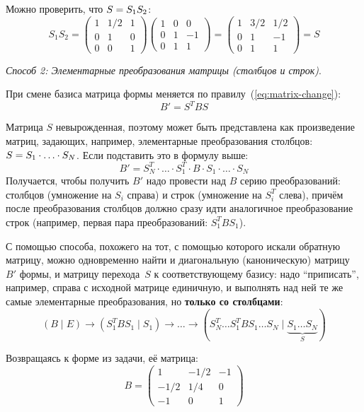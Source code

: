 \documentclass[a4paper,12pt]{article}
\begin{document}
\begin{solution}
    Можно проверить, что $S \hm= S_1 S_2$:
    \[
      S_1 S_2 = \begin{pmatrix}
        1 & 1/2 & 1\\
        0 & 1 & 0\\
        0 & 0 & 1
      \end{pmatrix} \begin{pmatrix}
        1 & 0 & 0\\
        0 & 1 & -1\\
        0 & 1 & 1
      \end{pmatrix} = \begin{pmatrix}
        1 & 3/2 & 1/2\\
        0 & 1 & -1\\
        0 & 1 & 1
      \end{pmatrix} = S
    \]
    
    \bigskip
    
    \emph{Способ 2: Элементарные преобразования матрицы (столбцов и строк)}.
    
    При смене базиса матрица формы меняется по правилу~(\ref{eq:matrix-change}):
    \[
      B' = S^T B S
    \]
    
    Матрица $S$ невырожденная, поэтому может быть представлена как произведение матриц, задающих, например, элементарные преобразования столбцов: $S \hm= S_1 \hm\cdot \ldots \hm\cdot S_N$.
    Если подставить это в формулу выше:
    \[
      B' = S_N^T \cdot \ldots \cdot S_1^T \cdot B \cdot S_1 \cdot \ldots \cdot S_N
    \]
    Получается, чтобы получить $B'$ надо провести над $B$ серию преобразований: столбцов (умножение на $S_i$ справа) и строк (умножение на $S_i^T$ слева), причём после преобразования столбцов должно сразу идти аналогичное преобразование строк (например, первая пара преобразований: $S_1^T B S_1$).
    
    С помощью способа, похожего на тот, с помощью которого искали обратную матрицу, можно одновременно найти и диагональную (каноническую) матрицу~$B'$ формы, и матрицу перехода~$S$ к соответствующему базису: надо ``приписать'', например, справа с исходной матрице единичную, и выполнять над ней те же самые элементарные преобразования, но \textbf{только со столбцами}:
    \[
      (B \mid E) \to (S_1^T B S_1 \mid S_1) \to \ldots \to (S_N^T \ldots S_1^T B S_1 \ldots S_N \mid \underbrace{S_1 \ldots S_N}_{S})
    \]
    
    Возвращаясь к форме из задачи, её матрица:
    \[
      B = \begin{pmatrix}
        1    & -1/2 & -1\\
        -1/2 & 1/4  & 0\\
        -1   & 0    & 1
      \end{pmatrix}
    \]
    

\end{solution}
\end{document}
